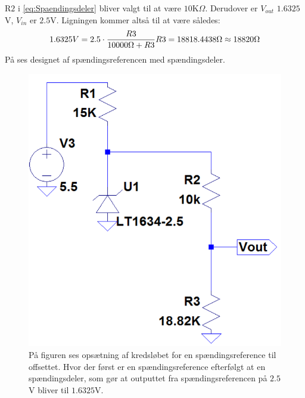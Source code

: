 R$2$ i \eqref{eq:Spaendingsdeler} bliver valgt til at være $10$K$\Omega$. Derudover er $V_{out}$ $1.6325$V, $V_{in}$ er $2.5$V. Ligningen kommer altså til at være således: 
\begin{equation}
1.6325V = 2.5 \cdot \dfrac{R3}{10000\Omega + R3} \\
R3 = 18818.4438\Omega \approx 18820\Omega
\end{equation}
\noindent På  ses designet af spændingsreferencen med spændingsdeler. 
\begin{figure}[H]
	\centering
	\includegraphics[scale=.5]{figures/cProblemloesning/OffsetSpaendingsRef2.PNG}
	\caption{På figuren ses opsætning af kredsløbet for en spændingsreference til offsettet. Hvor der først er en spændingsreference efterfølgt at en spændingsdeler, som gør at outputtet fra spændingsreferencen på $2.5$V bliver til $1.6325$V. }
	\label{fig:Spaendingsreference_offset}
\end{figure}

